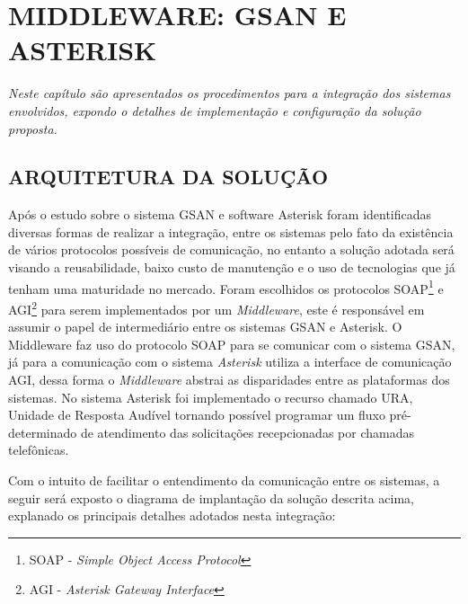 \chapter[Middleware: GSAN e Asterisk]{\textbf{\uppercase{Middleware: Gsan e Asterisk}}}

\textit{Neste capítulo são apresentados os procedimentos para a integração dos sistemas envolvidos, expondo o detalhes de implementação e configuração da solução proposta.}


\section{\textbf{\uppercase{Arquitetura da Solução}}}

Após o estudo sobre o sistema GSAN e software Asterisk foram identificadas diversas formas de realizar a integração, entre os sistemas pelo fato da existência de vários protocolos possíveis de comunicação, no entanto a solução adotada será visando a reusabilidade, baixo custo de manutenção e o uso de tecnologias que já tenham uma maturidade no mercado. Foram escolhidos os protocolos SOAP\footnote{SOAP - \textit{Simple Object Access Protocol}} e AGI\footnote{AGI - \textit{Asterisk Gateway Interface}} para serem implementados por um \textit{Middleware}, este é responsável em assumir o papel de intermediário entre os sistemas GSAN e Asterisk. O Middleware faz uso do protocolo SOAP para se comunicar com o sistema GSAN, já para a comunicação com o sistema \textit{Asterisk} utiliza a interface de comunicação AGI, dessa forma o \textit{Middleware} abstrai as disparidades entre as plataformas dos sistemas. No sistema Asterisk foi implementado o recurso chamado URA, Unidade de Resposta Audível tornando possível programar um fluxo pré-determinado de atendimento das solicitações recepcionadas por chamadas telefônicas.

Com o intuito de facilitar o entendimento da comunicação entre os sistemas, a seguir será exposto o diagrama de implantação da solução descrita acima, explanado os principais detalhes adotados nesta integração:


